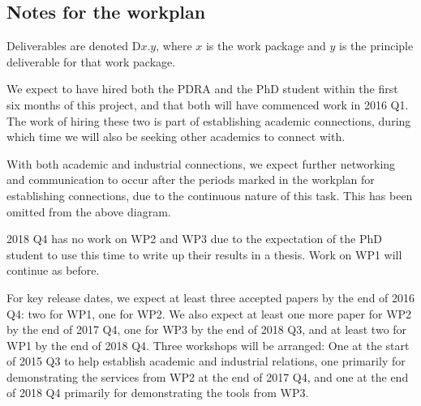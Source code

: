 \documentclass[a4paper,11pt]{article}
\begin{document}
\begin{landscape}
    \subsection*{Notes for the workplan}

    Deliverables are denoted D$x.y$, where $x$ is the work package and $y$ is the principle deliverable for that work package.

    We expect to have hired both the PDRA and the PhD student within the first six months of this project, and that both will have commenced work in 2016 Q1. The work of hiring these two is part of establishing academic connections, during which time we will also be seeking other academics to connect with.

    With both academic and industrial connections, we expect further networking and communication to occur after the periods marked in the workplan for establishing connections, due to the continuous nature of this task. This has been omitted from the above diagram.

    2018 Q4 has no work on WP2 and WP3 due to the expectation of the PhD student to use this time to write up their results in a thesis. Work on WP1 will continue as before.

    For key release dates, we expect at least three accepted papers by the end of 2016 Q4: two for WP1, one for WP2. We also expect at least one more paper for WP2 by the end of 2017 Q4, one for WP3 by the end of 2018 Q3, and at least two for WP1 by the end of 2018 Q4. Three workshops will be arranged: One at the start of 2015 Q3 to help establish academic and industrial relations, one primarily for demonstrating the services from WP2 at the end of 2017 Q4, and one at the end of 2018 Q4 primarily for demonstrating the tools from WP3.

    \end{landscape}
\end{document}
